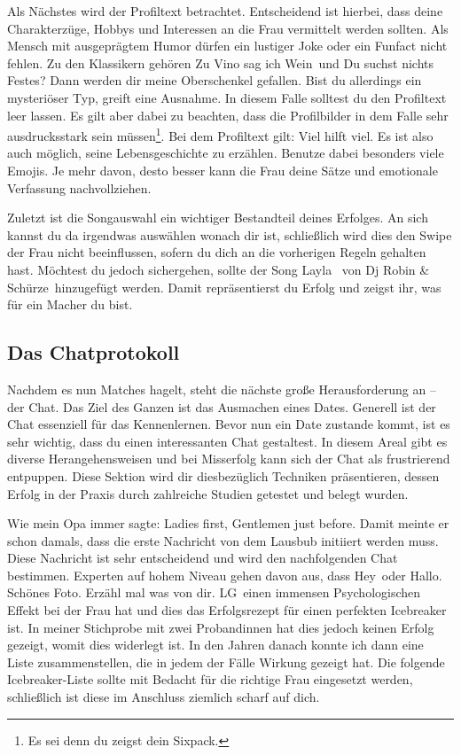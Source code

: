 Als Nächstes wird der Profiltext betrachtet. 
Entscheidend ist hierbei, dass deine Charakterzüge, Hobbys und Interessen an die Frau vermittelt werden sollten.
Als Mensch mit ausgeprägtem Humor dürfen ein lustiger Joke oder ein Funfact nicht fehlen.
Zu den Klassikern gehören \glqq Zu Vino sag ich Wein\grqq~und \glqq Du suchst nichts Festes? Dann werden dir meine Oberschenkel gefallen\grqq.
Bist du allerdings ein mysteriöser Typ, greift eine Ausnahme.
In diesem Falle solltest du den Profiltext leer lassen.
Es gilt aber dabei zu beachten, dass die Profilbilder in dem Falle sehr ausdrucksstark sein müssen\footnote{Es sei denn du zeigst dein Sixpack.}.
Bei dem Profiltext gilt: Viel hilft viel. 
Es ist also auch möglich, seine Lebensgeschichte zu erzählen.
Benutze dabei besonders viele Emojis.
Je mehr davon, desto besser kann die Frau deine Sätze und emotionale Verfassung nachvollziehen.


Zuletzt ist die Songauswahl ein wichtiger Bestandteil deines Erfolges.
An sich kannst du da irgendwas auswählen wonach dir ist, schließlich wird dies den Swipe der Frau nicht beeinflussen, sofern du dich an die vorherigen Regeln gehalten hast.
Möchtest du jedoch sichergehen, sollte der Song \glqq Layla\grqq~ von \glqq Dj Robin \& Schürze\grqq~hinzugefügt werden.
Damit repräsentierst du Erfolg und zeigst ihr, was für ein Macher du bist.



\subsection{Das Chatprotokoll}
\label{chapter-main-chat}

Nachdem es nun Matches hagelt, steht die nächste große Herausforderung an – der Chat.
Das Ziel des Ganzen ist das Ausmachen eines Dates.
Generell ist der Chat essenziell für das Kennenlernen.
Bevor nun ein Date zustande kommt, ist es sehr wichtig, dass du einen interessanten Chat gestaltest.
In diesem Areal gibt es diverse Herangehensweisen und bei Misserfolg kann sich der Chat als frustrierend entpuppen.
Diese Sektion wird dir diesbezüglich Techniken präsentieren, dessen Erfolg in der Praxis durch zahlreiche Studien getestet und belegt wurden.

Wie mein Opa immer sagte: \glqq Ladies first, Gentlemen just before\grqq.
Damit meinte er schon damals, dass die erste Nachricht von dem Lausbub initiiert werden muss.
Diese Nachricht ist sehr entscheidend und wird den nachfolgenden Chat bestimmen.
Experten auf hohem Niveau gehen davon aus, dass \glqq Hey\grqq~oder \glqq Hallo. Schönes Foto. Erzähl mal was von dir. LG\grqq~einen immensen Psychologischen Effekt bei der Frau hat und dies das Erfolgsrezept für einen perfekten Icebreaker ist.
In meiner Stichprobe mit zwei Probandinnen hat dies jedoch keinen Erfolg gezeigt, womit dies widerlegt ist.
In den Jahren danach konnte ich dann eine Liste zusammenstellen, die in jedem der Fälle Wirkung gezeigt hat.
Die folgende Icebreaker-Liste sollte mit Bedacht für die richtige Frau eingesetzt werden, schließlich ist diese im Anschluss ziemlich scharf auf dich.

